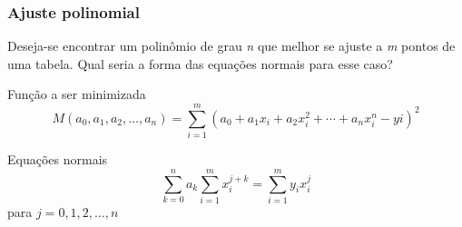 \begin{frame}
    \frametitle{Ajuste polinomial}

    Deseja-se encontrar um polinômio de grau \textit{n} que melhor se ajuste a \textit{m} pontos de uma tabela. Qual seria a forma das equações normais para esse caso?

    \pause
    \begin{block}
        {Função a ser minimizada}
        \[
            M (a_0,a_1, a_2, \ldots, a_n) = \sum_{i=1}^m {\left(
                    a_0 + a_1 x_i + a_2 x_i^2 + \cdots + a_n x_i^n
                    - yi
            \right)^2}
        \]
    \end{block}

    \pause
    \begin{block}
        {Equações normais}
        \[
            \sum_{k=0}^n a_k {\sum_{i=1}^m {x_i^{j+k}}} = \sum_{i=1}^m {y_i x_i^j}
        \]
        para \(j=0, 1, 2, \ldots, n\)
    \end{block}
\end{frame}


